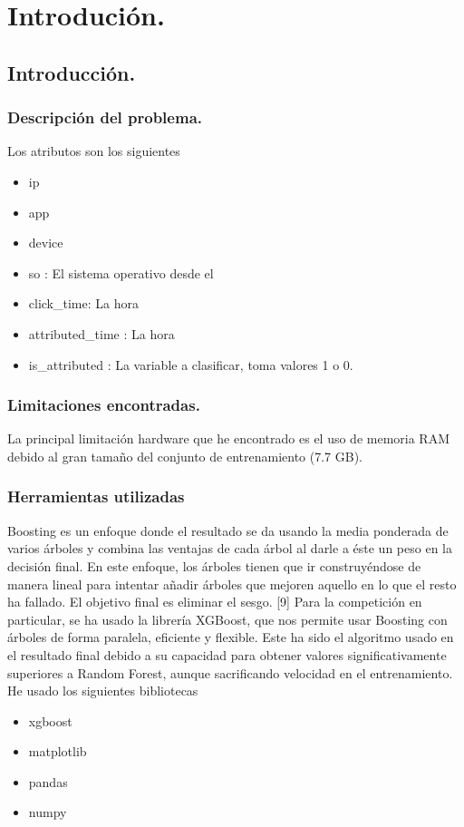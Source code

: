 \chapter[Introducción]{Introdución.}
\section{Introducción.}
\subsection{Descripción del problema.}
Los atributos son los siguientes
\begin{itemize}
	\item ip
	\item app
	\item device
	\item so : El sistema operativo desde el 
	\item click\_time: La hora 
	\item attributed\_time : La hora 
	\item is\_attributed : La variable a clasificar, toma valores 1 o 0.
\end{itemize}
\subsection{Limitaciones encontradas.}
La principal limitación hardware que he encontrado es el uso de memoria RAM debido al gran tamaño del conjunto de entrenamiento (7.7 GB).
\subsection{Herramientas utilizadas}
Boosting es un enfoque donde el resultado se da usando la media
ponderada de varios árboles y combina las ventajas de cada árbol al darle
a éste un peso en la decisión final. En este enfoque, los árboles tienen
que ir construyéndose de manera lineal para intentar añadir árboles que
mejoren aquello en lo que el resto ha fallado. El objetivo final es eliminar el
sesgo. [9]
Para la competición en particular, se ha usado la librería XGBoost,
que nos permite usar Boosting con árboles de forma paralela, eficiente y
flexible. Este ha sido el algoritmo usado en el resultado final debido a su
capacidad para obtener valores significativamente superiores a Random
Forest, aunque sacrificando velocidad en el entrenamiento.
He usado los siguientes bibliotecas
\begin{itemize}
	\item xgboost
	\item matplotlib
	\item pandas
	\item numpy
\end{itemize}